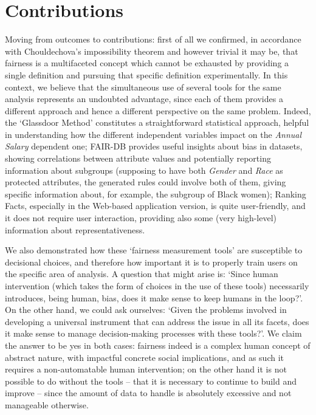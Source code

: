\section{Contributions}
Moving from outcomes to contributions: first of all we confirmed, in accordance with Chouldechova's impossibility theorem \cite{chouldechova2017fair} and however trivial it may be, that fairness is a multifaceted concept which cannot be exhausted by providing a single definition and pursuing that specific definition experimentally. In this context, we believe that the simultaneous use of several tools for the same analysis represents an undoubted advantage, since each of them provides a different approach and hence a different perspective on the same problem. Indeed, the `Glassdoor Method' constitutes a straightforward statistical approach, helpful in understanding how the different independent variables impact on the \textit{Annual Salary} dependent one; FAIR-DB provides useful insights about bias in datasets, showing correlations between attribute values and potentially reporting information about subgroups (supposing to have both \textit{Gender} and \textit{Race} as protected attributes, the generated rules could involve both of them, giving specific information about, for example, the subgroup of Black women); Ranking Facts, especially in the Web-based application version, is quite user-friendly, and it does not require user interaction, providing also some (very high-level) information about representativeness.

We also demonstrated how these `fairness measurement tools' are susceptible to decisional choices, and therefore how important it is to properly train users on the specific area of analysis. A question that might arise is: `Since human intervention (which takes the form of choices in the use of these tools) necessarily introduces, being human, bias, does it make sense to keep humans in the loop?'. On the other hand, we could ask ourselves: `Given the problems involved in developing a universal instrument that can address the issue in all its facets, does it make sense to manage decision-making processes with these tools?'. We claim the answer to be yes in both cases: fairness indeed is a complex human concept of abstract nature, with impactful concrete social implications, and as such it requires a non-automatable human intervention; on the other hand it is not possible to do without the tools -- that it is necessary to continue to build and improve -- since the amount of data to handle is absolutely excessive and not manageable otherwise.

